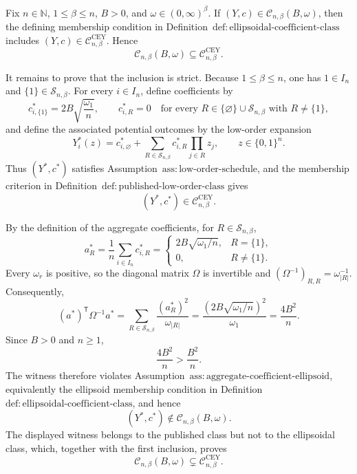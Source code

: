Fix \(n\in\mathbb N\), \(1\leq\beta\leq n\), \(B>0\), and \(\omega\in(0,\infty)^\beta\).  If \((Y,c)\in\mathcal C_{n,\beta}(B,\omega)\), then the defining membership condition in Definition~\(\mathrm{def{:}ellipsoidal\text{-}coefficient\text{-}class}\) includes \((Y,c)\in\mathcal C^{\mathrm{CEY}}_{n,\beta}\).  Hence
\[
\mathcal C_{n,\beta}(B,\omega)\subseteq\mathcal C^{\mathrm{CEY}}_{n,\beta}.
\]

It remains to prove that the inclusion is strict.  Because \(1\leq\beta\leq n\), one has \(1\in I_n\) and \(\{1\}\in\mathcal S_{n,\beta}\).  For every \(i\in I_n\), define coefficients by
\[
c^*_{i,\{1\}}=2B\sqrt{\frac{\omega_1}{n}},
\qquad
c^*_{i,R}=0
\quad\text{for every }R\in\{\varnothing\}\cup\mathcal S_{n,\beta}\text{ with }R\neq\{1\},
\]
and define the associated potential outcomes by the low-order expansion
\[
Y_i^*(z)=c^*_{i,\varnothing}+
\sum_{R\in\mathcal S_{n,\beta}}c^*_{i,R}
\prod_{j\in R}z_j,
\qquad z\in\{0,1\}^n.
\]
Thus \((Y^*,c^*)\) satisfies Assumption~\(\mathrm{ass{:}low\text{-}order\text{-}schedule}\), and the membership criterion in Definition~\(\mathrm{def{:}published\text{-}low\text{-}order\text{-}class}\) gives
\[
(Y^*,c^*)\in\mathcal C^{\mathrm{CEY}}_{n,\beta}.
\]

By the definition of the aggregate coefficients, for \(R\in\mathcal S_{n,\beta}\),
\[
a_R^*=\frac1n\sum_{i\in I_n}c^*_{i,R}
=
\begin{cases}
2B\sqrt{\omega_1/n},&R=\{1\},\\
0,&R\neq\{1\}.
\end{cases}
\]
Every \(\omega_r\) is positive, so the diagonal matrix \(\Omega\) is invertible and \((\Omega^{-1})_{R,R}=\omega_{|R|}^{-1}\).  Consequently,
\[
(a^*)^{\mathsf T}\Omega^{-1}a^*
=\sum_{R\in\mathcal S_{n,\beta}}
\frac{(a_R^*)^2}{\omega_{|R|}}
=\frac{\left(2B\sqrt{\omega_1/n}\right)^2}{\omega_1}
=\frac{4B^2}{n}.
\]
Since \(B>0\) and \(n\geq1\),
\[
\frac{4B^2}{n}>\frac{B^2}{n}.
\]
The witness therefore violates Assumption~\(\mathrm{ass{:}aggregate\text{-}coefficient\text{-}ellipsoid}\), equivalently the ellipsoid membership condition in Definition~\(\mathrm{def{:}ellipsoidal\text{-}coefficient\text{-}class}\), and hence
\[
(Y^*,c^*)\notin\mathcal C_{n,\beta}(B,\omega).
\]
The displayed witness belongs to the published class but not to the ellipsoidal class, which, together with the first inclusion, proves
\[
\mathcal C_{n,\beta}(B,\omega)\subsetneq
\mathcal C^{\mathrm{CEY}}_{n,\beta}.
\]